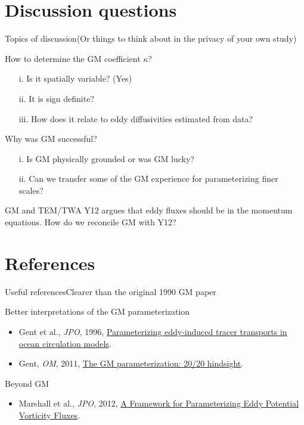 \documentclass{beamer}
\begin{document}
\section{Discussion questions}
\begin{frame}{Topics of discussion}{(Or things to think about in the privacy of your own study)}

\begin{block}{How to determine the GM coefficient $\kappa$?}
\begin{enumerate}
  \item[i.] Is it spatially variable? (Yes)
  \item[ii.] It is sign definite?
  \item[iii.] How does it relate to eddy diffusivities estimated from data?
\end{enumerate}
\end{block}

\begin{exampleblock}{Why was GM successful?}
\begin{enumerate}
  \item[i.] Is GM physically grounded or was GM lucky?
  \item[ii.] Can we transfer some of the GM experience for parameterizing finer scales?
\end{enumerate}
\end{exampleblock}

\begin{block}{GM and TEM/TWA}
  Y12 argues that eddy fluxes should be in the momentum equations.
  How do we reconcile GM with Y12?
\end{block}
\end{frame}

\section{References}

\begin{frame}{Useful references}{Clearer than the original 1990 GM paper}
\begin{block}{Better interpretations of the GM parameterization}
  \begin{itemize}
    \item Gent et al., {\it JPO}, 1996, \href{http://google.com}{Parameterizing
    eddy-induced tracer transports in ocean circulation models}.
    \item {Gent}, {\it OM}, 2011, \href{http://www.sciencedirect.com/science/article/pii/S1463500310001253}{ The
     GM parameterization: 20/20 hindsight}.
  \end{itemize}
\end{block}
\vspace{.5cm}
\begin{exampleblock}{Beyond GM}
  \begin{itemize}
    \item Marshall et al., {\it JPO}, 2012, \href{http://journals.ametsoc.org/doi/abs/10.1175/JPO-D-11-048.1}{ A
          Framework for Parameterizing Eddy Potential Vorticity Fluxes}.
  \end{itemize}
\end{exampleblock}
\end{frame}
\end{document}
